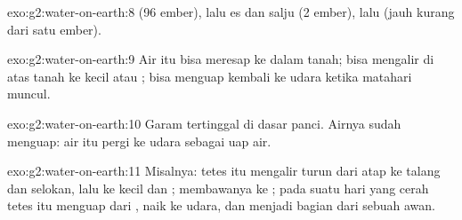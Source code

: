 \begin{solution}{exo:g2:water-on-earth:8}
 (96 ember), lalu es dan salju (2 ember), lalu  (jauh kurang
dari satu ember).
\end{solution}

\begin{solution}{exo:g2:water-on-earth:9}
Air itu bisa meresap ke dalam tanah; bisa mengalir di atas tanah ke 
kecil atau ; bisa menguap kembali ke udara ketika matahari muncul.
\end{solution}

\begin{solution}{exo:g2:water-on-earth:10}
Garam tertinggal di dasar panci. Airnya sudah menguap: air itu pergi ke
udara sebagai uap air.
\end{solution}

\begin{solution}{exo:g2:water-on-earth:11}
Misalnya: tetes itu mengalir turun dari atap ke talang dan selokan, lalu ke
 kecil dan ;  membawanya ke ; pada suatu hari yang
cerah tetes itu menguap dari , naik ke udara, dan menjadi bagian dari
sebuah awan.
\end{solution}
